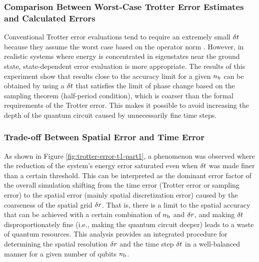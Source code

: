 \documentclass[jctc-draft.tex]{subfiles}
\begin{document}
\subsubsection{Comparison Between Worst-Case Trotter Error Estimates and Calculated Errors}
Conventional Trotter error evaluations tend to require an extremely small
$\delta t$ because they assume the worst case based on the operator norm
\cite{Burgarth2024.PhysRevResearch.6.043155}. However, in realistic systems
where energy is concentrated in eigenstates near the ground state,
state-dependent error evaluation is more appropriate. The results of this
experiment show that results close to the accuracy limit for a given $n_{\mathrm{b}}$ can
be obtained by using a $\delta t$ that satisfies the limit of phase change based
on the sampling theorem (half-period condition), which is coarser than the
formal requirements of the Trotter error. This makes it possible to avoid
increasing the depth of the quantum circuit caused by unnecessarily fine time
steps.

\subsubsection{Trade-off Between Spatial Error and Time Error}
As shown in Figure \ref{fig:trotter-error-t1-part1}, a phenomenon was observed
where the reduction of the system's energy error saturated even when $\delta t$
was made finer than a certain threshold. This can be interpreted as the dominant
error factor of the overall simulation shifting from the time error (Trotter
error or sampling error) to the spatial error (mainly spatial discretization
error) caused by the coarseness of the spatial grid $\delta r$. That is, there is
a limit to the spatial accuracy that can be achieved with a certain combination
of $n_{\mathrm{b}}$ and $\delta r$, and making $\delta t$ disproportionately fine (i.e.,
making the quantum circuit deeper) leads to a waste of quantum resources. This
analysis provides an integrated procedure for determining the spatial resolution
$\delta r$ and the time step $\delta t$ in a well-balanced manner for a given
number of qubits $n_{\mathrm{b}}$.
\end{document}
